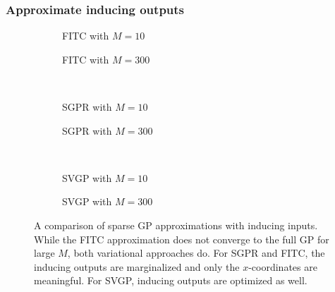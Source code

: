 \subsubsection{Approximate inducing outputs}
\begin{figure}[p]
    \begin{subfigure}[b]{\halffigurewidth}
        \centering
        \caption{
            \label{fig:gp:variational:spgp}
            FITC with $M = 10$
        }
    \end{subfigure}
    \hfill
    \begin{subfigure}[b]{\halffigurewidth}
        \centering
        \caption{
            \label{fig:gp:variational:spgp_huge}
            FITC with $M = 300$
        }
    \end{subfigure}\\[\figureskip]
    \begin{subfigure}[b]{\halffigurewidth}
        \centering
        \caption{
            \label{fig:gp:variational:sgpr}
            SGPR with $M = 10$
        }
    \end{subfigure}
    \hfill
    \begin{subfigure}[b]{\halffigurewidth}
        \centering
        \caption{
            \label{fig:gp:variational:sgpr_huge}
            SGPR with $M = 300$
        }
    \end{subfigure}\\[\figureskip]
    \begin{subfigure}[b]{\halffigurewidth}
        \centering
        \caption{
            \label{fig:gp:variational:svgp}
            SVGP with $M = 10$
        }
    \end{subfigure}
    \hfill
    \begin{subfigure}[b]{\halffigurewidth}
        \centering
        \caption{
            \label{fig:gp:variational:svgp_huge}
            SVGP with $M = 300$
        }
    \end{subfigure}
    \caption[Variational GP posteriors]{
        \label{fig:gp:variational}
        A comparison of sparse GP approximations with inducing inputs.
        While the FITC approximation does not converge to the full GP for large $M$, both variational approaches do.
        For SGPR and FITC, the inducing outputs are marginalized and only the $x$-coordinates are meaningful.
        For SVGP, inducing outputs are optimized as well.
    }
\end{figure}
